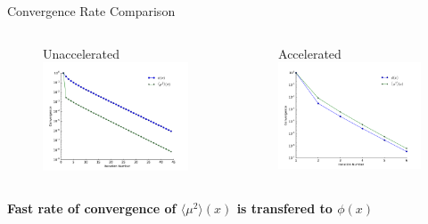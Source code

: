 \documentclass[10pt]{beamer}
\newcommand{\edd}{\langle \mu^2 \rangle}
\begin{document}
\begin{frame}{Convergence Rate Comparison}

    \onslide<+->
    \begin{columns}
    \begin{column}{.5\paperwidth}
    \begin{figure} \centering
    	Unaccelerated
        \includegraphics[width=.45\paperwidth]{figs/converge_una.pdf}
    \end{figure}
    \end{column}
    \begin{column}{.5\paperwidth}
    \begin{figure} \centering
    	Accelerated
        \includegraphics[width=.45\paperwidth]{figs/converge_acc.pdf}
    \end{figure}
   	\end{column}
   	\end{columns}

    \onslide<+->
    \vfill
    \centerline{\textbf{Fast rate of convergence of $\edd(x)$ is transfered to $\phi(x)$}}

\end{frame}
\end{document}
